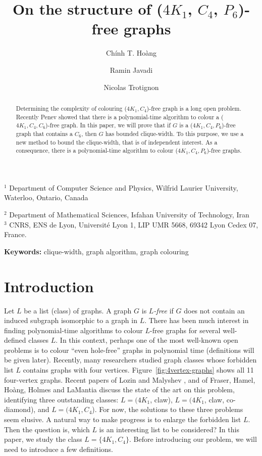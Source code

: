 \documentclass[12pt]{article}
\title {On the structure of {($4K_1$, $C_4$, $P_6$)}-free graphs}
\author{
	Ch\'inh T. Ho\`ang\inst{1}
	\and Ramin Javadi\inst{2}
	\and Nicolas Trotignon\inst{3} 
}
\date{}
\def\inst#1{$^{#1}$}
\begin{document}
	\maketitle
	\begin{center}
		{\footnotesize
			
			\inst{1} Department of Computer Science and Physics, Wilfrid Laurier	University, \\Waterloo, Ontario, Canada
			
			\inst{2} Department of Mathematical Sciences, Isfahan University of Technology, 
			Iran \\
			\inst{3}  CNRS, ENS de Lyon, Université Lyon 1, LIP UMR 5668, 69342 Lyon Cedex 07, France.
		}
		
	\end{center}
	
	\begin{abstract}
		Determining the complexity of colouring ($4K_1, C_4$)-free graph is a long open problem.
		Recently Penev showed that there is a polynomial-time algorithm to colour a ($4K_1, C_4, C_6$)-free graph. In this paper, we will prove that if $G$ is a ($4K_1, C_4, P_6$)-free graph that contains a $C_6$, then $G$ has bounded clique-width. To this purpose, we use a new method to bound the clique-width, that is of independent interest. As a consequence, there is a polynomial-time algorithm to colour ($4K_1, C_4, P_6$)-free graphs.
	\end{abstract}
	{\bf Keywords:} clique-width, graph algorithm, graph colouring
	
	
	
	\section{Introduction}
	
	Let $L$ be a list (class) of graphs. A graph $G$ is \emph{$L$-free} if $G$ does not contain an induced subgraph isomorphic to a graph in $L$. There has been much interest in finding polynomial-time algorithms to colour $L$-free graphs for several well-defined classes $L$. In this context, perhaps one of the most well-known open problems is to colour ``even hole-free'' graphs in polynomial time (definitions will be given later). Recently, many researchers studied graph classes  whose forbidden list $L$ contains graphs with four vertices. Figure~\ref{fig:4vertex-graphs} shows all 11 four-vertex graphs. Recent papers of Lozin and Malyshev \cite{Lozin}, and of Fraser, Hamel, Ho\`ang, Holmes and LaMantia \cite{FraHam2017}  discuss the state of the art on this problem,  identifying three outstanding classes: $L=(4K_1$, claw),
	$L=(4K_1$, claw, co-diamond), and $L=(4K_1, C_4$). For now, the solutions to these three problems seem elusive. A natural way to make progress is to enlarge the forbidden list $L$. Then the question is, which $L$ is an interesting list to be considered? In this paper, we study the class $L=\{4K_1, C_4\}$. Before introducing our problem, we will need to introduce a few definitions.
	
\end{document}
